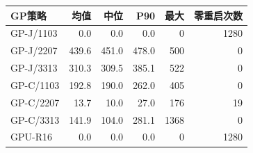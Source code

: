 \begin{tabular}{@{}lrrrrr@{}}
\toprule
GP策略 & 均值 & 中位 & P90 & 最大 & 零重启次数 \\ \midrule
GP-J/1103 & 0.0 & 0.0 & 0.0 & 0 & 1280 \\
GP-J/2207 & 439.6 & 451.0 & 478.0 & 500 & 0 \\
GP-J/3313 & 310.3 & 309.5 & 385.1 & 522 & 0 \\
GP-C/1103 & 192.8 & 190.0 & 262.0 & 405 & 0 \\
GP-C/2207 & 13.7 & 10.0 & 27.0 & 176 & 19 \\
GP-C/3313 & 141.9 & 104.0 & 281.1 & 1368 & 0 \\
GPU-R16 & 0.0 & 0.0 & 0.0 & 0 & 1280 \\
\bottomrule
\end{tabular}
